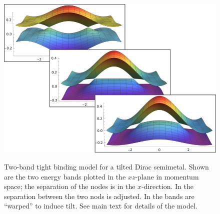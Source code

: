 \begin{figure}[p]
\begin{subcaptionblock}[t]{\textwidth}
{    }{%
      \includegraphics[width=.7\textwidth]{figures/bendingTransition-small}
    }
    \caption{\label{fig:typeii:bendbands}The ``warping'' parameter \( t_0 \) increased from left to right, %
      \( t_0 = 0, 2 \gamma_0, 3 \gamma_0 \), %
      transitioning the system from Type-I to Type-II.}
  \end{subcaptionblock}
  \caption{Two-band tight binding model for a tilted Dirac semimetal.
    Shown are the two energy bands plotted in the \( xz \)-plane in momentum space;
    the separation of the nodes is in the \( x \)-direction.
    In  the separation between the two nods is adjusted.
    In  the bands are ``warped'' to induce tilt.
    See main text for details of the model.
  }
\end{figure}

